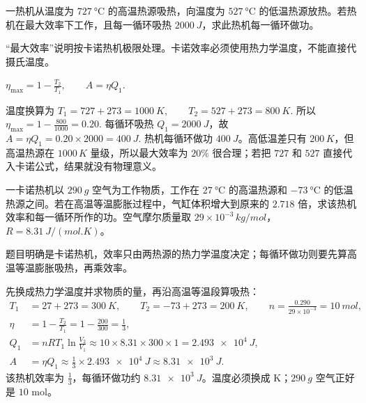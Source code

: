 \documentclass[lang=cn,11pt]{elegantbook}
\begin{document}
\begin{exercise}
一热机从温度为 \(\SI{727}{\celsius}\) 的高温热源吸热，向温度为 \(\SI{527}{\celsius}\) 的低温热源放热。若热机在最大效率下工作，且每一循环吸热 \(\SI{2000}{J}\)，求此热机每一循环做功。
\end{exercise}

\begin{solution}
“最大效率”说明按卡诺热机极限处理。卡诺效率必须使用热力学温度，不能直接代摄氏温度。

 \(\eta_{\max}=1-\frac{T_2}{T_1},\qquad A=\eta Q_1.\) 

温度换算为
 \(T_1=727+273=\SI{1000}{K},\qquad T_2=527+273=\SI{800}{K}.\) 
所以
 \(\eta_{\max}=1-\frac{800}{1000}=0.20.\) 
每循环吸热 \(Q_1=\SI{2000}{J}\)，故
 \(A=\eta Q_1=0.20\times2000=\SI{400}{J}.\) 
热机每循环做功 \(\SI{400}{J}\)。高低温差只有 \(200\,\si{K}\)，但高温热源在 \(1000\,\si{K}\) 量级，所以最大效率为 \(20\%\) 很合理；若把 \(727\) 和 \(527\) 直接代入卡诺公式，结果就没有物理意义。
\end{solution}

\begin{exercise}
一卡诺热机以 \(\SI{290}{g}\) 空气为工作物质，工作在 \(\SI{27}{\celsius}\) 的高温热源和 \(\SI{-73}{\celsius}\) 的低温热源之间。若在高温等温膨胀过程中，气缸体积增大到原来的 \(2.718\) 倍，求该热机效率和每一循环所作的功。空气摩尔质量取 \(29\times10^{-3}\,\si{kg/mol}\)，\(R=\SI{8.31}{J/(mol.K)}\)。
\end{exercise}

\begin{solution}
题目明确是卡诺热机，效率只由两热源的热力学温度决定；每循环做功则要先算高温等温膨胀吸热，再乘效率。

先换成热力学温度并求物质的量，再沿高温等温段算吸热：
\[
\begin{aligned}
T_1&=27+273=\SI{300}{K},\qquad
T_2=-73+273=\SI{200}{K},\qquad
n=\frac{0.290}{29\times10^{-3}}=10\ \si{mol},\\
\eta&=1-\frac{T_2}{T_1}
=1-\frac{200}{300}
=\frac13,\\
Q_1&=nRT_1\ln\frac{V_2}{V_1}
\approx 10\times 8.31\times300\times1
=\SI{2.493e4}{J},\\
A&=\eta Q_1
\approx \frac13\times \SI{2.493e4}{J}
\approx \SI{8.31e3}{J}.
\end{aligned}
\]
该热机效率为 \(\frac13\)，每循环做功约 \(\SI{8.31e3}{J}\)。温度必须换成 K；\(\SI{290}{g}\) 空气正好是 \(10\) mol。
\end{solution}
\end{document}
